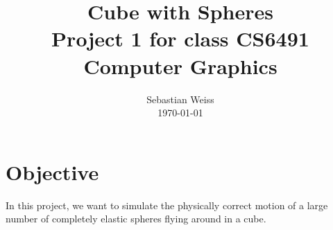 \documentclass[journal, letterpaper]{IEEEtran}
\begin{document}
\title{Cube with Spheres \\
	{\large Project 1 for class CS6491 Computer Graphics}}
\author{Sebastian Weiss \\ \today}

\maketitle


\section{Objective}
In this project, we want to simulate the physically correct motion of a large number of completely elastic spheres flying around in a cube.
\end{document}
